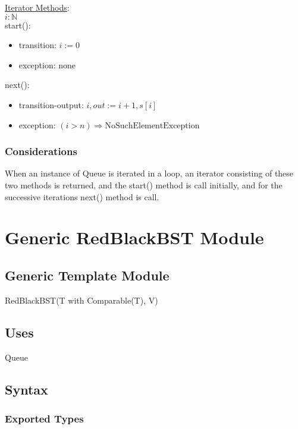 \documentclass[12pt]{article}
\begin{document}
\medskip

\noindent \underline{Iterator Methods}:\\

$i: \mathbb{N}$\\

\noindent start():
\begin{itemize}
\item transition: $i := 0$
\item exception: none
\end{itemize}

\noindent next():
\begin{itemize}
\item transition-output: $i, out := i + 1, s[i]$
\item exception: $( i > n) \Rightarrow \text{NoSuchElementException}$
\end{itemize}

\subsubsection* {Considerations}

When an instance of Queue is iterated in a loop, an iterator consisting of these two methods is returned, 
and the start() method is call initially, and for the successive iterations next() method is call.\\

\newpage

\section* {Generic RedBlackBST Module}

\subsection*{Generic Template Module}

RedBlackBST(T with Comparable(T), V)

\subsection* {Uses}

Queue

\subsection* {Syntax}

\subsubsection* {Exported Types}
\end{document}
